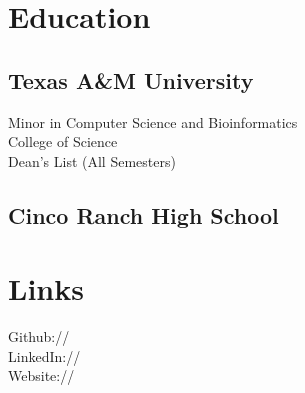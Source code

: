 \documentclass[]{vishrutrao-resume}
\begin{document}
%
%
\lastupdated

%
%



%
%

\begin{minipage}[t]{0.33\textwidth} 


\section{Education} 

\subsection{Texas A\&M University}
Minor in Computer Science and Bioinformatics \\
College of Science \\
Dean's List (All Semesters) \\
\sectionsep


\subsection{Cinco Ranch High School}
\sectionsep


\section{Links} 
Github:// \href{https://github.com/vishrutrao}{} \\
LinkedIn://  \href{https://www.linkedin.com/in/vishrut-rao-b76907b1}{} \\
Website://  \href{https://www.vishrutrao.com/}{} \\


\end{minipage}
\end{document}

